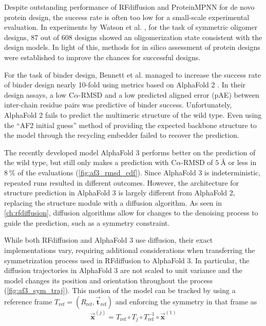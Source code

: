 Despite outstanding performance of RFdiffusion and ProteinMPNN for de novo protein design, the success rate is often too low for a small-scale experimental evaluation. In experiments by Watson et al. \cite{RFdiffusion}, for the task of symmetric oligomer designs, 87 out of 608 designs showed an oligomerization state consistent with the design models. In light of this, methods for in silico assessment of protein designs were established to improve the chances for successful designs. 

For the task of binder design, Bennett et al. managed to increase the success rate of binder design nearly 10-fold using metrics based on AlphaFold 2 \cite{binder_design}. In their design assays, a low C$\alpha$-RMSD and a low predicted aligned error (pAE) between inter-chain residue pairs was predictive of binder success. Unfortunately, AlphaFold 2 fails to predict the multimeric structure of the wild type. Even using the ``AF2 initial guess'' method \cite{binder_design} of providing the expected backbone structure to the model through the recycling embedder failed to recover the prediction. 

The recently developed model AlphaFold 3 \cite{af3} performs better on the prediction of the wild type, but still only makes a prediction with C$\alpha$-RMSD of $\SI{5}{\angstrom}$ or less in $\SI{8}{\percent}$ of the evaluations (\autoref{fig:af3_rmsd_cdf}). Since AlphaFold 3 is indeterministic, repeated runs  resulted in different outcomes. However, the architecture for structure prediction in AlphaFold 3 is largely different from AlphaFold 2, replacing the structure module with a diffusion algorithm. As seen in \autoref{ch:rfdiffusion}, diffusion algorithms allow for changes to the denoising process to guide the prediction, such as a symmetry constraint. 

While both RFdiffusion and AlphaFold 3 use diffusion, their exact implementations vary, requiring additional considerations when transferring the symmetrization process used in RFdiffusion to AlphaFold 3. In particular, the diffusion trajectories in AlphaFold 3 are not scaled to unit variance and the model changes its position and orientation throughout the process (\autoref{fig:af3_sym_traj}). This motion of the model can be tracked by using a reference frame $T_{\text{ref}} = (R_{\text{ref}}, \vec{\mathbf{t}}_{\text{ref}})$ and enforcing the symmetry in that frame as 
\begin{equation}
\vec{\mathbf{x}}^{(j)} = T_{\text{ref}} \circ T_j \circ T_{\text{ref}}^{-1} \circ \vec{\mathbf{x}}^{(1)}
\end{equation}

